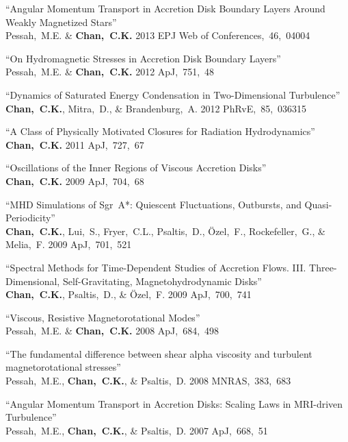 \begin{ilist}
\item ``Angular Momentum Transport in Accretion Disk Boundary Layers Around Weakly Magnetized Stars''\\
  Pessah,~M.E. \& \textbf{Chan,~C.K.}
  2013  EPJ Web of Conferences,~46,~04004

\item ``On Hydromagnetic Stresses in Accretion Disk Boundary Layers''\\
  Pessah,~M.E. \& \textbf{Chan,~C.K.}
  2012 ApJ,~751,~48

\item ``Dynamics of Saturated Energy Condensation in Two-Dimensional Turbulence''\\
  \textbf{Chan,~C.K.}, Mitra,~D., \& Brandenburg,~A.
  2012 PhRvE,~85,~036315

\item ``A Class of Physically Motivated Closures for Radiation Hydrodynamics''\\
  \textbf{Chan,~C.K.}
  2011 ApJ,~727,~67

\item ``Oscillations of the Inner Regions of Viscous Accretion Disks''\\
  \textbf{Chan,~C.K.}
  2009 ApJ,~704,~68

\item ``MHD Simulations of Sgr~A*: Quiescent Fluctuations, Outbursts, and Quasi-Periodicity''\\
  \textbf{Chan,~C.K.}, Lui,~S., Fryer,~C.L., Psaltis,~D., \"Ozel,~F., Rockefeller,~G., \& Melia,~F.
  2009 ApJ,~701,~521

\item ``Spectral Methods for Time-Dependent Studies of Accretion Flows.
  III. Three-Dimensional, Self-Gravitating, Magnetohydrodynamic Disks''\\
  \textbf{Chan,~C.K.}, Psaltis,~D., \& \"Ozel,~F.
  2009 ApJ,~700,~741

\item ``Viscous, Resistive Magnetorotational Modes''\\
  Pessah,~M.E. \& \textbf{Chan,~C.K.}
  2008 ApJ,~684,~498

\item ``The fundamental difference between shear alpha viscosity and turbulent magnetorotational stresses''\\
  Pessah,~M.E., \textbf{Chan,~C.K.}, \& Psaltis,~D.
  2008 MNRAS,~383,~683

\item ``Angular Momentum Transport in Accretion Disks: Scaling Laws in MRI-driven Turbulence''\\
  Pessah,~M.E., \textbf{Chan,~C.K.}, \& Psaltis,~D.
  2007 ApJ,~668,~51


\end{ilist}
